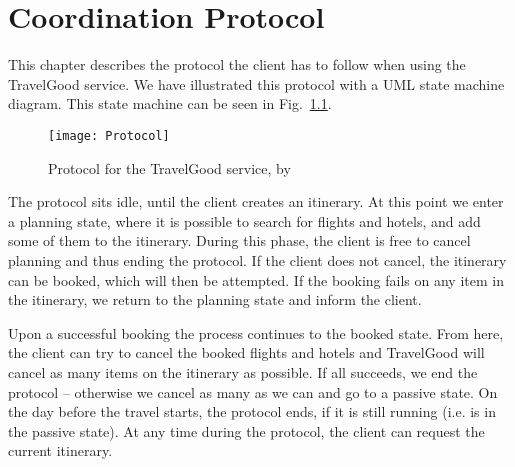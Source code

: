 \chapter{Coordination Protocol}
\kim

\noindent
This chapter describes the protocol the client has to follow when using the TravelGood service. We have illustrated this protocol with a UML state machine diagram. This state machine can be seen in Fig.~\ref{fig:protocol}.

\begin{figure}[H]
\centering
\texttt{[image: Protocol]}
\caption{Protocol for the TravelGood service, by \pet{}}
\label{fig:protocol}
\end{figure}

The protocol sits idle, until the client creates an itinerary. At this point we enter a planning state, where it is possible to search for flights and hotels, and add some of them to the itinerary. During this phase, the client is free to cancel planning and thus ending the protocol. If the client does not cancel, the itinerary can be booked, which will then be attempted. If the booking fails on any item in the itinerary, we return to the planning state and inform the client. 

Upon a successful booking the process continues to the booked state. From here, the client can try to cancel the booked flights and hotels and TravelGood will cancel as many items on the itinerary as possible. If all succeeds, we end the protocol -- otherwise we cancel as many as we can and go to a passive state. On the day before the travel starts, the protocol ends, if it is still running (i.e. is in the passive state). At any time during the protocol, the client can request the current itinerary.
